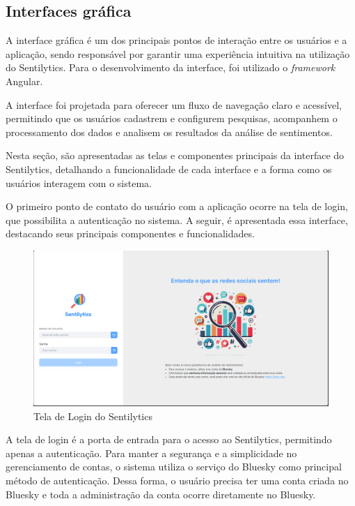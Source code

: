\documentclass[
	12pt,				%
	oneside,			%
	a4paper,			%
	english,			%
	french,				%
	spanish,			%
	brazil				%
	]{abntex2}
\begin{document}
\hypertarget{interfaces-gruxe1fica}{%
\subsection{Interfaces gráfica}\label{interfaces-gruxe1fica}}

A interface gráfica é um dos principais pontos de interação entre os
usuários e a aplicação, sendo responsável por garantir uma experiência
intuitiva na utilização do Sentilytics. Para o desenvolvimento da
interface, foi utilizado o \emph{framework} Angular.

A interface foi projetada para oferecer um fluxo de navegação claro e
acessível, permitindo que os usuários cadastrem e configurem pesquisas,
acompanhem o processamento dos dados e analisem os resultados da análise
de sentimentos.

Nesta seção, são apresentadas as telas e componentes principais da
interface do Sentilytics, detalhando a funcionalidade de cada interface
e a forma como os usuários interagem com o sistema.

O primeiro ponto de contato do usuário com a aplicação ocorre na tela de
login, que possibilita a autenticação no sistema. A seguir, é
apresentada essa interface, destacando seus principais componentes e
funcionalidades.

\begin{figure}[htbp]
\hypertarget{tela_login}{%
\caption{Tela de Login do Sentilytics}\label{tela_login}
\begin{center}
\includegraphics[scale=0.2]{imagens/sentilytics/interface-grafica/tela-login.png}
\end{center}
}
\end{figure}

A tela de login é a porta de entrada para o acesso ao Sentilytics,
permitindo apenas a autenticação. Para manter a segurança e a
simplicidade no gerenciamento de contas, o sistema utiliza o serviço do
Bluesky como principal método de autenticação. Dessa forma, o usuário
precisa ter uma conta criada no Bluesky e toda a administração da conta
ocorre diretamente no Bluesky.
\end{document}
